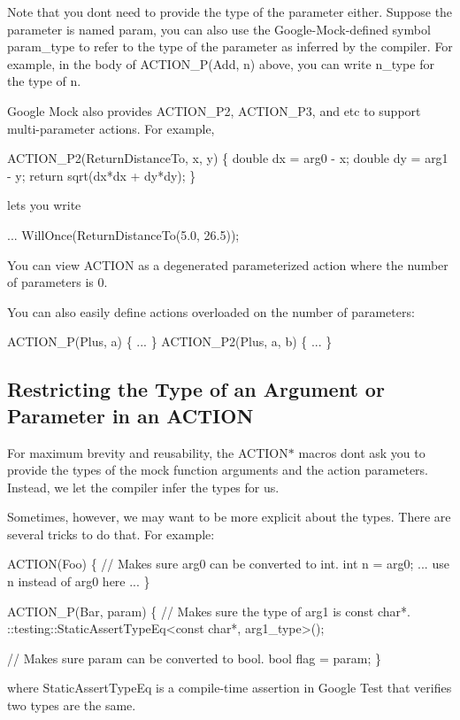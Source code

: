 Note that you don\textquotesingle{}t need to provide the type of the parameter either. Suppose the parameter is named {\ttfamily param}, you can also use the Google-\/\+Mock-\/defined symbol {\ttfamily param\+\_\+type} to refer to the type of the parameter as inferred by the compiler. For example, in the body of {\ttfamily A\+C\+T\+I\+O\+N\+\_\+\+P(\+Add, n)} above, you can write {\ttfamily n\+\_\+type} for the type of {\ttfamily n}.

Google Mock also provides {\ttfamily A\+C\+T\+I\+O\+N\+\_\+\+P2}, {\ttfamily A\+C\+T\+I\+O\+N\+\_\+\+P3}, and etc to support multi-\/parameter actions. For example, 
\begin{DoxyCode}
ACTION\_P2(ReturnDistanceTo, x, y) \{
  \textcolor{keywordtype}{double} dx = arg0 - x;
  \textcolor{keywordtype}{double} dy = arg1 - y;
  \textcolor{keywordflow}{return} sqrt(dx*dx + dy*dy);
\}
\end{DoxyCode}
 lets you write 
\begin{DoxyCode}
... WillOnce(ReturnDistanceTo(5.0, 26.5));
\end{DoxyCode}


You can view {\ttfamily A\+C\+T\+I\+ON} as a degenerated parameterized action where the number of parameters is 0.

You can also easily define actions overloaded on the number of parameters\+: 
\begin{DoxyCode}
ACTION\_P(Plus, a) \{ ... \}
ACTION\_P2(Plus, a, b) \{ ... \}
\end{DoxyCode}


\subsection*{Restricting the Type of an Argument or Parameter in an A\+C\+T\+I\+ON}

For maximum brevity and reusability, the {\ttfamily A\+C\+T\+I\+O\+N$\ast$} macros don\textquotesingle{}t ask you to provide the types of the mock function arguments and the action parameters. Instead, we let the compiler infer the types for us.

Sometimes, however, we may want to be more explicit about the types. There are several tricks to do that. For example\+: 
\begin{DoxyCode}
ACTION(Foo) \{
  \textcolor{comment}{// Makes sure arg0 can be converted to int.}
  \textcolor{keywordtype}{int} n = arg0;
  ... use n instead of arg0 here ...
\}

ACTION\_P(Bar, param) \{
  \textcolor{comment}{// Makes sure the type of arg1 is const char*.}
  ::testing::StaticAssertTypeEq<const char*, arg1\_type>();

  \textcolor{comment}{// Makes sure param can be converted to bool.}
  \textcolor{keywordtype}{bool} flag = param;
\}
\end{DoxyCode}
 where {\ttfamily Static\+Assert\+Type\+Eq} is a compile-\/time assertion in Google Test that verifies two types are the same.

